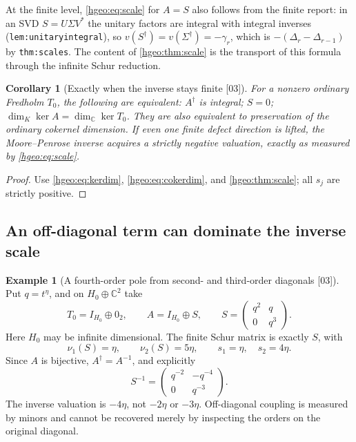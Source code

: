 \documentclass[11pt,letterpaper]{article}
\numberwithin{equation}{section}
\newtheorem{corollary}[corollary]{Corollary}
\theoremstyle{definition}
\newtheorem{example}[example]{Example}
\theoremstyle{remark}
\newcommand{\C}{\mathbb C}
\newcommand{\K}{K}
\newcommand{\src}[1]{\textup{\textsf{\small[#1]}}}
\newcommand{\replabel}[1]{\nolinkurl{#1}}
\begin{document}
At the finite level, \eqref{hgeo:eq:scale} for $A=S$ also follows from the
finite report: in an SVD $S=U\Sigma V^*$ the unitary factors are integral
with integral inverses (\replabel{lem:unitaryintegral}), so
$v(S^\dagger)=v(\Sigma^\dagger)=-\gamma_r$, which is
$-(\Delta_r-\Delta_{r-1})$ by \replabel{thm:scales}. The content of
\cref{hgeo:thm:scale} is the transport of this formula through the infinite
Schur reduction.

\begin{corollary}[Exactly when the inverse stays finite \src{03}]
\label{hgeo:cor:finiteinverse}
For a nonzero ordinary Fredholm $T_0$, the following are equivalent:
$A^\dagger$ is integral; $S=0$; $\dim_\K\ker A=\dim_\C\ker T_0$.
They are also equivalent to preservation of the ordinary cokernel
dimension. If even one finite defect direction is lifted, the
Moore--Penrose inverse acquires a strictly negative valuation,
exactly as measured by \eqref{hgeo:eq:scale}.
\end{corollary}
\begin{proof}
Use \eqref{hgeo:eq:kerdim}, \eqref{hgeo:eq:cokerdim}, and
\cref{hgeo:thm:scale}; all $s_j$ are strictly positive.
\end{proof}

\subsection{An off-diagonal term can dominate the inverse scale}

\begin{example}[A fourth-order pole from second- and third-order diagonals
\src{03}]\label{hgeo:ex:pole}
Put $q=t^\eta$, and on $H_0\oplus\C^2$ take
\[
 T_0=I_{H_0}\oplus0_2,
 \qquad A=I_{H_0}\oplus
 S,\qquad S=\begin{pmatrix}q^2&q\\0&q^3\end{pmatrix}.
\]
Here $H_0$ may be infinite dimensional. The finite Schur matrix is
exactly $S$, with
\[
 \nu_1(S)=\eta,\qquad \nu_2(S)=5\eta,
 \qquad s_1=\eta,
 \quad s_2=4\eta.
\]
Since $A$ is bijective, $A^\dagger=A^{-1}$, and explicitly
\[
 S^{-1}=\begin{pmatrix}q^{-2}&-q^{-4}\\0&q^{-3}\end{pmatrix}.
\]
The inverse valuation is $-4\eta$, not $-2\eta$ or $-3\eta$.
Off-diagonal coupling is measured by minors and cannot be recovered
merely by inspecting the orders on the original diagonal.
\end{example}
\end{document}
